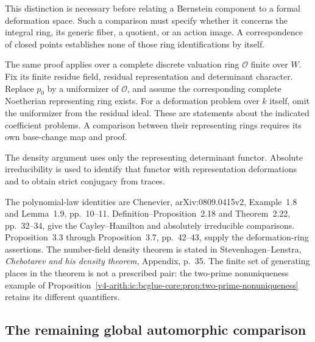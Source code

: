 This distinction is necessary before relating a Bernstein component
to a formal deformation space. Such a comparison must specify
whether it concerns the integral ring, its generic fiber, a quotient,
or an action image. A correspondence of closed points establishes
none of those ring identifications by itself.


\begin{remark}
\label{v4-arith:ic:w10-e:coefficient-variants}
The same proof applies over a complete discrete valuation ring
$\mathcal O$ finite over $W$. Fix its finite residue field,
residual representation and determinant character.
Replace $p_0$ by a uniformizer of $\mathcal O$, and assume the
corresponding complete Noetherian representing ring exists.
For a deformation problem over $k$ itself, omit the uniformizer
from the residual ideal. These are statements about the indicated
coefficient problems. A comparison between their representing rings
requires its own base-change map and proof.

The density argument uses only the representing determinant functor.
Absolute irreducibility is used to identify that functor with
representation deformations and to obtain strict conjugacy from traces.
\end{remark}

The polynomial-law identities are Chenevier, arXiv:0809.0415v2,
Example~1.8 and Lemma~1.9, pp.~10--11.
Definition--Proposition~2.18 and Theorem~2.22, pp.~32--34,
give the Cayley--Hamilton and absolutely irreducible comparisons.
Proposition~3.3 through Proposition~3.7, pp.~42--43,
supply the deformation-ring assertions. The number-field density theorem is stated in
Stevenhagen--Lenstra, \emph{Chebotarev and his density theorem},
Appendix, p.~35. The finite set of generating places in the theorem
is not a prescribed pair: the two-prime nonuniqueness example of
Proposition~\ref{v4-arith:ic:bcglue-core:prop:two-prime-nonuniqueness}
retains its different quantifiers.

\subsection{The remaining global automorphic comparison}

